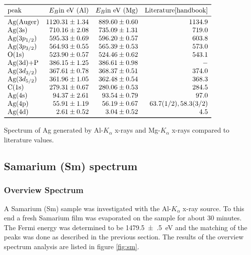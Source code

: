 \documentclass[a4paper]{scrartcl}
\numberwithin{equation}{section}
\numberwithin{figure}{section}
\numberwithin{table}{section}
\begin{document}
\begin{table}
\centering
$
\begin{array}{lrrr}
\toprule
\text{peak} & E_B \text{in eV (Al)}  &  E_B \text{in eV (Mg)} & \text{Literature} \cite{handbook} \\
\midrule
\text{Ag(Auger)} &  1120.31 \pm 1.34 &  889.60 \pm 0.60 & 1134.9\\
\text{Ag(3s)} &  710.16 \pm 2.08 &  735.09 \pm 1.31 &719.0\\
\text{Ag}(3p_{1/2}) & 595.33 \pm 0.69 &   596.20 \pm 0.57 &603.8 \\
\text{Ag}(3p_{3/2}) & 564.93 \pm 0.55 &   565.39 \pm 0.53  & 573.0\\
\text{O(1s)} & 523.90 \pm 0.57 &  524.46 \pm 0.62 &  543.1 \\
 \text{Ag(3d)+P} & 386.15 \pm 1.25 & 386.61 \pm 0.98  &-\\
\text{Ag}(3d_{3/2}) & 367.61 \pm 0.78 &  368.37 \pm 0.51 & 374.0 \\
\text{Ag} (3d_{5/2}) &  361.96 \pm 1.05 & 362.48 \pm 0.54 & 368.3 \\
 \text{C(1s)} & 279.31 \pm 0.67 &  280.06 \pm 0.53 & 284.5 \\
\text{Ag(4s)} & 94.37 \pm 2.61 &  93.54 \pm 0.79 & 97.0 \\
\text{Ag(4p)} & 55.91 \pm 1.19 & 56.19 \pm 0.67  & 63.7 (1/2), 58.3 (3/2) \\
 \text{Ag(4d)} & 2.61 \pm 0.52 &  3.04 \pm 0.52 & 4.5 \\
 \bottomrule
\end{array}
$
\caption{
\small Spectrum of Ag generated by Al-$K_\alpha$ x-rays and Mg-$K_\alpha$ x-rays compared to literature values.   } 
	\label{fig:tabelle}
\end{table}



\subsection{Samarium (Sm) spectrum}
\subsubsection{Overview Spectrum}
A Samarium (Sm) sample was investigated with the Al-$K_\alpha$ x-ray source. To this end a fresh Samarium film was evaporated on the sample for about 30 minutes. The Fermi energy was determined to be \SI{1479.5(5)}{eV} and the matching of the peaks was done as described in the previous section. The results of the overview spectrum analysis are listed in figure \ref{fig:sm}.
\end{document}
